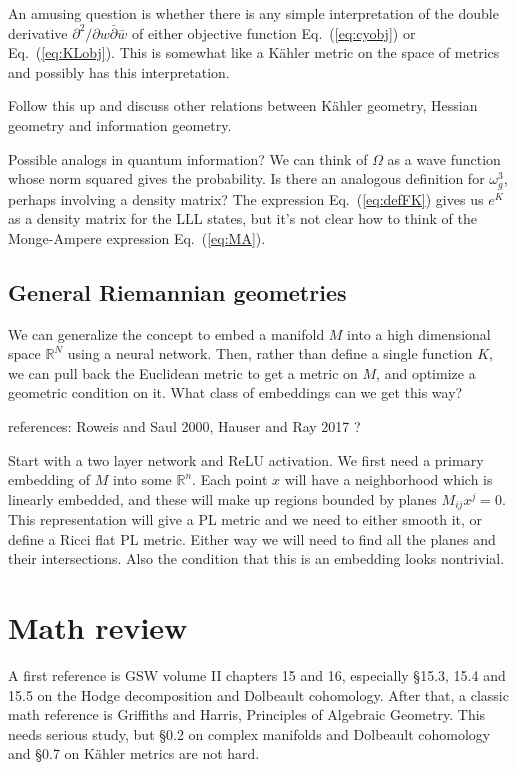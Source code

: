 \documentclass[12pt]{article}
\def\IR{\mathbb{R}}
\newcommand{\eq}[1]{Eq.~(\ref{eq:#1})}
\begin{document}
An amusing question is whether there is any simple interpretation of the double derivative
$\partial^2/\partial w\bar \partial \bar w$ of either objective function \eq{cyobj} or \eq{KLobj}.
This is somewhat like a K\"ahler metric
on the space of metrics and possibly has this interpretation.

Follow this up and discuss other relations between K\"ahler geometry, Hessian geometry and information geometry.

Possible analogs in quantum information?  We can think of $\Omega$ as a wave function whose norm squared
gives the probability.  Is there an analogous definition for $\omega_g^3$, perhaps involving a density matrix? 
The expression \eq{defFK} gives us $e^K$ as a density matrix for the LLL states, but it's not clear how to think
of the Monge-Ampere expression \eq{MA}.

\subsection{ General Riemannian geometries }

We can generalize the concept to embed a manifold $M$ into a high dimensional space $\IR^N$ using a neural network.
Then, rather than define a single function $K$, we can pull back the Euclidean metric to get a metric on $M$,
and optimize a geometric condition on it.  What class of embeddings can we get this way?

references: Roweis and Saul 2000, Hauser and Ray 2017 ?

Start with a two layer network and ReLU activation.  We first need a primary embedding of $M$ into some $\IR^n$.
Each point $x$ will have a neighborhood which is
linearly embedded, and these will make up regions bounded by planes $M_{ij} x^j=0$.  This representation
will give a PL metric and we need to either smooth it, or define a Ricci flat PL metric.  Either way we will need
to find all the planes and their intersections.  Also the condition that this is an embedding looks nontrivial.
\fi

\appendix

\section{ Math review }

A first reference is GSW volume II chapters 15 and 16, especially \S 15.3, 15.4 and 15.5 on 
the Hodge decomposition and Dolbeault cohomology.
After that, a classic math reference is Griffiths and Harris, Principles of Algebraic Geometry.
This needs serious study, but \S 0.2 on complex manifolds and Dolbeault cohomology
and \S 0.7 on K\"ahler metrics are not hard.
\end{document}
